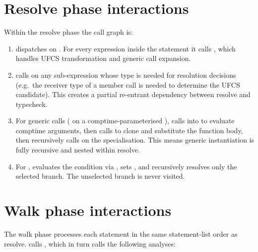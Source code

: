 \section{Resolve phase interactions}
\label{sec:ci-resolve}

\pnum
Within the resolve phase the call graph is:

\begin{enumerate}
\item {} dispatches on .  For every
  expression inside the statement it calls , which
  handles UFCS transformation and generic call expansion.

\item {} calls  on any
  sub-expression whose type is needed for resolution decisions (e.g.\ the
  receiver type of a member call is needed to determine the UFCS candidate).
  This creates a partial re-entrant dependency between resolve and typecheck.

\item For generic calls ( on a comptime-parameterised
  ),  calls into
   to evaluate comptime arguments, then calls
   to clone and substitute the function body, then
  recursively calls  on the specialisation.  This
  means generic instantiation is fully recursive and nested within resolve.

\item For ,  evaluates
  the condition via , sets
  , and recursively resolves only the selected branch.
  The unselected branch is never visited.
\end{enumerate}

\section{Walk phase interactions}
\label{sec:ci-walk}

\pnum
The walk phase processes each statement in the same statement-list order as
resolve.   calls , which in turn
calls the following analyses:

